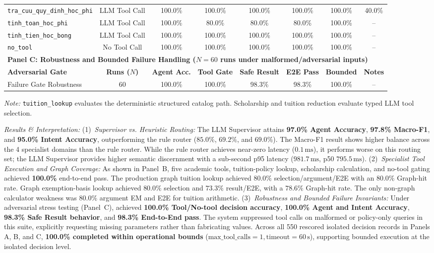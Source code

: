 \begin{table}[!htbp]
{\begin{tabular}{lccccccc}
\texttt{tra\_cuu\_quy\_dinh\_hoc\_phi} & LLM Tool Call & 100.0\% & 100.0\% & 100.0\% & 100.0\% & 100.0\% & 40.0\% \\
\texttt{tinh\_toan\_hoc\_phi} & LLM Tool Call & 100.0\% & 80.0\% & 80.0\% & 80.0\% & 100.0\% & -- \\
\texttt{tinh\_tien\_hoc\_bong} & LLM Tool Call & 100.0\% & 100.0\% & 100.0\% & 100.0\% & 100.0\% & -- \\
\texttt{no\_tool} & No Tool Call & 100.0\% & 100.0\% & 100.0\% & 100.0\% & 100.0\% & -- \\
\midrule
\multicolumn{8}{l}{\textbf{Panel C: Robustness and Bounded Failure Handling ($N=60$ runs under malformed/adversarial inputs)}} \\
\midrule
\textbf{Adversarial Gate} & \textbf{Runs ($N$)} & \textbf{Agent Acc.} & \textbf{Tool Gate} & \textbf{Safe Result} & \textbf{E2E Pass} & \textbf{Bounded} & \textbf{Notes} \\
\midrule
Failure Gate Robustness    & 60 & 100.0\% & 100.0\% & 98.3\% & 98.3\% & 100.0\% & -- \\
\bottomrule
\end{tabular}
}
\smallskip
\parbox{\columnwidth}{\footnotesize\emph{Note:} \texttt{tuition\_lookup} evaluates the deterministic structured catalog path. Scholarship and tuition reduction evaluate typed LLM tool selection.}
\end{table}

\emph{Results \& Interpretation:}
(1)~\emph{Supervisor vs. Heuristic Routing:} The LLM Supervisor attains \textbf{97.0\% Agent Accuracy}, \textbf{97.8\% Macro-F1}, and \textbf{95.0\% Intent Accuracy}, outperforming the rule router ($85.0\%$, $69.2\%$, and $69.0\%$). The Macro-F1 result shows higher balance across the 4 specialist domains than the rule router. While the rule router achieves near-zero latency ($0.1\,\text{ms}$), it performs worse on this routing set; the LLM Supervisor provides higher semantic discernment with a sub-second p95 latency ($981.7\,\text{ms}$, p50 $795.5\,\text{ms}$).
(2)~\emph{Specialist Tool Execution and Graph Coverage:} As shown in Panel~B, five academic tools, tuition-policy lookup, scholarship calculation, and no-tool gating achieved \textbf{100.0\%} end-to-end pass. The production graph tuition lookup achieved $80.0\%$ selection/argument/E2E with an $80.0\%$ Graph-hit rate. Graph exemption-basis lookup achieved $80.0\%$ selection and $73.3\%$ result/E2E, with a $78.6\%$ Graph-hit rate. The only non-graph calculator weakness was $80.0\%$ argument EM and E2E for tuition arithmetic.
(3)~\emph{Robustness and Bounded Failure Invariants:} Under adversarial stress testing (Panel~C), \system{} achieved \textbf{100.0\% Tool/No-tool decision accuracy}, \textbf{100.0\% Agent and Intent Accuracy}, \textbf{98.3\% Safe Result behavior}, and \textbf{98.3\% End-to-End pass}. The system suppressed tool calls on malformed or policy-only queries in this suite, explicitly requesting missing parameters rather than fabricating values. Across all 550 rescored isolated decision records in Panels A, B, and C, \textbf{100.0\% completed within operational bounds} ($\text{max\_tool\_calls}=1, \text{timeout}=60\,\text{s}$), supporting bounded execution at the isolated decision level.

